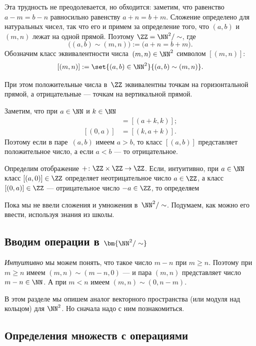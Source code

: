 Эта трудность не преодолевается, но обходится: заметим, что равенство $a - m = b - n$ равносильно равенству $a + n = b + m$. Сложение определено для натуральных чисел, так что его и примем за определение того, что $(a, b)$ и $(m, n)$ лежат на одной прямой. Поэтому
$\ZZ = \NN^2 / \sim$, где
\[
	\bigl(
		(a, b) \sim
		(m, n)
	\bigr)
	:=
	\bigl(
		a + n = b + m
	\bigr)
	.
\]
Обозначим класс эквивалентности числа~$(m, n) \in \NN^2$ символом $[(m, n)]$:
\[
	[(m, n)] :=
	\set{(a, b) \in \NN^2}{(a, b) \sim (m, n)}.
\]

При этом положительные числа в~$\ZZ$ эквивалентны точкам на горизонтальной прямой, а отрицательные --- точкам на вертикальной прямой.


Заметим, что при $a \in \NN$ и $k \in \NN$
\begin{align*}
	[(a, 0)] &= [(a + k, k)];
	\\
	[(0, a)] &= [(k, a + k)].
\end{align*}
Поэтому если в паре~$(a, b)$ имеем $a > b$, то класс $[(a, b)]$ представляет положительное число, а если $a < b$ --- то отрицательное.


Определим отображение $+ \colon \ZZ \times \ZZ \to \ZZ$. Если, интуитивно, при $a \in \NN$ класс $[(a, 0)] \in \ZZ$ определяет неотрицательное число $a \in \ZZ$, а класс $[(0, a)] \in \ZZ$ --- отрицательное число $-a \in \ZZ$, то определяем


Пока мы не ввели сложения и умножения в~$\NN^2 / \sim$. Подумаем, как можно его ввести, используя знания из школы.

\subsection[Вводим операции в $\NN^2/\sim$]{Вводим операции в $\bm{\NN^2/\sim}$}

\emph{Интуитивно} мы можем понять, что такое число $m - n$ при $m \geq n$. Поэтому при $m \geq n$ имеем $(m, n) \sim (m - n, 0)$ --- и пара $(m, n)$ представляет число $m - n \in \NN$. А при $m < n$ имеем $(m, n) \sim (0, n - m)$.


В этом разделе мы опишем аналог векторного пространства (или модуля над кольцом) для $\NN^2$. Но сначала надо с ним познакомиться.

\subsection{Определения множеств с операциями}

